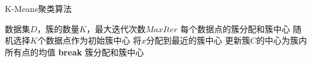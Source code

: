 \documentclass{article}
\begin{document}
	
	\begin{algorithm}
		\caption{K-Means聚类算法}
		\begin{algorithmic}[1]
			\Require 数据集$D$，簇的数量$K$，最大迭代次数$MaxIter$
			\Ensure 每个数据点的簇分配和簇中心
			\State 随机选择$K$个数据点作为初始簇中心
			\State 将$x$分配到最近的簇中心
			\EndFor
			\State 更新簇$C$的中心为簇内所有点的均值
			\EndFor
			\State \textbf{break}
			\EndIf
			\EndFor
			\State \Return 簇分配和簇中心
		\end{algorithmic}
	\end{algorithm}
	
\end{document}
